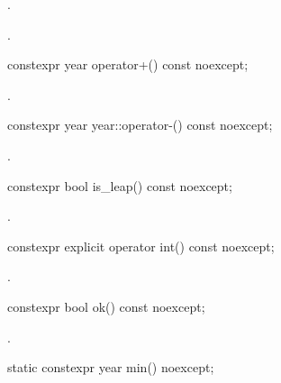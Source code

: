 \begin{itemdescr}
\pnum
\effects
{}.

\pnum
\returns
{}.
\end{itemdescr}

%
\begin{itemdecl}
constexpr year operator+() const noexcept;
\end{itemdecl}

\begin{itemdescr}
\pnum
\returns
{}.
\end{itemdescr}

%
\begin{itemdecl}
constexpr year year::operator-() const noexcept;
\end{itemdecl}

\begin{itemdescr}
\pnum
\returns
{}.
\end{itemdescr}

%
\begin{itemdecl}
constexpr bool is_leap() const noexcept;
\end{itemdecl}

\begin{itemdescr}
\pnum
\returns
{}.
\end{itemdescr}

%
\begin{itemdecl}
constexpr explicit operator int() const noexcept;
\end{itemdecl}

\begin{itemdescr}
\pnum
\returns
{}.
\end{itemdescr}

%
\begin{itemdecl}
constexpr bool ok() const noexcept;
\end{itemdecl}

\begin{itemdescr}
\pnum
\returns
{}.
\end{itemdescr}

%
\begin{itemdecl}
static constexpr year min() noexcept;
\end{itemdecl}

